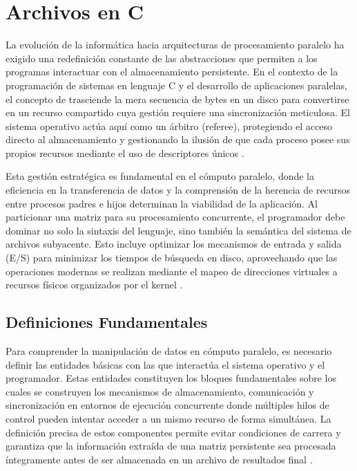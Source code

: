 %
%
\section{Archivos en C}
\label{sec:archivos}


La evolución de la informática hacia arquitecturas de procesamiento paralelo ha exigido una redefinición constante de las abstracciones que permiten a los programas interactuar con el almacenamiento persistente. En el contexto de la programación de sistemas en lenguaje C y el desarrollo de aplicaciones paralelas, el concepto de  trasciende la mera secuencia de bytes en un disco para convertirse en un recurso compartido cuya gestión requiere una sincronización meticulosa. El sistema operativo actúa aquí como un árbitro (referee), protegiendo el acceso directo al almacenamiento y gestionando la ilusión de que cada proceso posee sus propios recursos mediante el uso de descriptores únicos \cite{berkeley_cs162, marquez2015}.

Esta gestión estratégica es fundamental en el cómputo paralelo, donde la eficiencia en la transferencia de datos y la comprensión de la herencia de recursos entre procesos padres e hijos determinan la viabilidad de la aplicación. Al particionar una matriz para su procesamiento concurrente, el programador debe dominar no solo la sintaxis del lenguaje, sino también la semántica del sistema de archivos subyacente. Esto incluye optimizar los mecanismos de entrada y salida (E/S) para minimizar los tiempos de búsqueda en disco, aprovechando que las operaciones modernas se realizan mediante el mapeo de direcciones virtuales a recursos físicos organizados por el kernel \cite{stanford_cs111, berkeley_cs162}.

\subsection{Definiciones Fundamentales}

Para comprender la manipulación de datos en cómputo paralelo, es necesario definir las entidades básicas con las que interactúa el sistema operativo y el programador. Estas entidades constituyen los bloques fundamentales sobre los cuales se construyen los mecanismos de almacenamiento, comunicación y sincronización en entornos de ejecución concurrente donde múltiples hilos de control pueden intentar acceder a un mismo recurso de forma simultánea. La definición precisa de estos componentes permite evitar condiciones de carrera y garantiza que la información extraída de una matriz persistente sea procesada íntegramente antes de ser almacenada en un archivo de resultados final \cite{stanford_cs111}.

